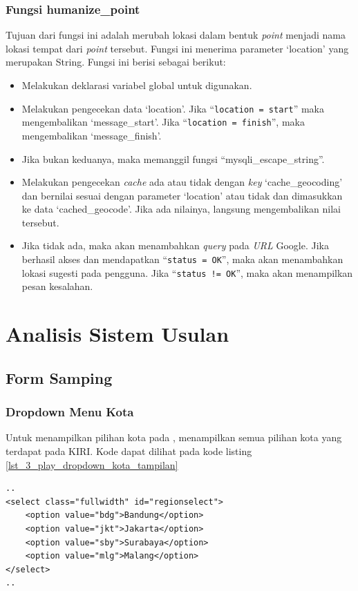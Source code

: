 \subsubsection{Fungsi humanize\_point}
Tujuan dari fungsi ini adalah merubah lokasi dalam bentuk \textit{point} menjadi nama lokasi tempat dari \textit{point} tersebut. Fungsi ini menerima parameter `location' yang merupakan String. Fungsi ini berisi sebagai berikut:
\begin{itemize}
	\item Melakukan deklarasi variabel global untuk digunakan.
	\item Melakukan pengecekan data `location'. Jika ``\texttt{location = start}'' maka mengembalikan `message\_start'. Jika ``\texttt{location = finish}'', maka mengembalikan `message\_finish'.
	\item Jika bukan keduanya, maka memanggil fungsi ``mysqli\_escape\_string''.
	\item Melakukan pengecekan \textit{cache} ada atau tidak dengan \textit{key} `cache\_geocoding' dan bernilai sesuai dengan parameter `location' atau tidak dan dimasukkan ke data `cached\_geocode'. Jika ada nilainya, langsung mengembalikan nilai tersebut.
	\item Jika tidak ada, maka akan menambahkan \textit{query} pada \textit{URL} Google. Jika berhasil akses dan mendapatkan ``\texttt{status = OK}'', maka akan menambahkan lokasi sugesti pada pengguna. Jika ``\texttt{status != OK}'', maka akan menampilkan pesan kesalahan. 
\end{itemize}
\section{Analisis Sistem Usulan}
\label{sec:perubahan}

\subsection{Form Samping}
\subsubsection{Dropdown Menu Kota}
Untuk menampilkan pilihan kota pada \play, menampilkan semua pilihan kota yang terdapat pada KIRI. Kode dapat dilihat pada kode listing \ref{lst_3_play_dropdown_kota_tampilan}

\begin{lstlisting}[caption=Menampilkan pilihan kota kepada pengguna ,label = {lst_3_play_dropdown_kota_tampilan}]
..
<select class="fullwidth" id="regionselect">
    <option value="bdg">Bandung</option>
    <option value="jkt">Jakarta</option>
    <option value="sby">Surabaya</option>
    <option value="mlg">Malang</option>
</select>
..
\end{lstlisting}

